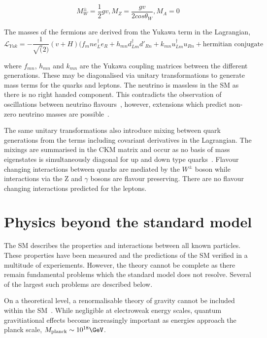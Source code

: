 \begin{equation}
M_W^\pm = \frac{1}{2}gv, M_Z = \frac{gv}{2cos\theta_W}, M_A = 0
\end{equation}

The masses of the fermions are derived from the Yukawa term in the Lagrangian, 
\begin{equation}
\mathcal{L}_{Yuk} = - \frac{1}{\sqrt(2)}(v + H)(f_mn e_L^{\dagger}e_R + h_{mn} d_{Lm}^{\dagger}d'_{Rn} + k_{mn} u_{Lm}^{\dagger}u_{Rn} + \text{hermitian conjugate}
\end{equation}

where $f_{mn}$, $h_{mn}$ and $k_{mn}$ are the Yukawa coupling matrices between the different generations. These may be diagonalised via unitary transformations
to generate mass terms for the quarks and leptons. The neutrino is massless in the SM as there is no right handed component.
This contradicts the observation of oscillations between neutrino flavours~\cite{neutOsc},
however, extensions which predict non-zero neutrino masses are possible~\cite{neutM}. 

The same unitary transformations also introduce mixing between quark generations from the 
terms including covariant derivatives in the Lagrangian. The mixings are summarised in the 
CKM matrix and occur as no basis of mass eigenstates is simultaneously diagonal for 
up and down type quarks~\cite{CKM}. Flavour changing
interactions between quarks are mediated by the $W^{\pm}$ boson while interactions via 
the Z and $\gamma$ bosons are flavour preserving. There are no flavour changing interactions
predicted for the leptons.

\section{Physics beyond the standard model}

The SM describes the properties and interactions between all known particles. These properties 
have been measured and the predictions of the SM verified in a multitude
of experiements. However, the theory cannot be complete 
as there remain fundamental problems which the standard model does not resolve.
Several of the largest such problems are described below.

On a theoretical level, a renormalisable theory of gravity cannot be included within 
the SM~\cite{gravRenorm}. While negligible at electroweak energy
scales, quantum gravitiational effects become increasingly important as
energies approach the planck scale, $M_{\text{planck}} \sim 10^{18} \GeV$. 

